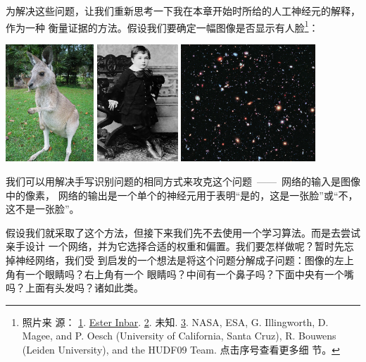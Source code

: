 为解决这些问题，让我们重新思考一下我在本章开始时所给的人工神经元的解释，作为一种
衡量证据的方法。假设我们要确定一幅图像是否显示有人脸\footnote{照片来
  源：
  \href{http://commons.wikimedia.org/wiki/File:Kangaroo_ST_03.JPG}{1}. \href{http://commons.wikimedia.org/wiki/User:ST}{Ester
    Inbar}. \href{http://commons.wikimedia.org/wiki/File:Albert_Einstein_at_the_age_of_three_(1882).jpg}{2}. 未知. \href{http://commons.wikimedia.org/wiki/File:The_Hubble_eXtreme_Deep_Field.jpg}{3}. NASA,
  ESA, G. Illingworth, D. Magee, and P. Oesch (University of California, Santa
  Cruz), R. Bouwens (Leiden University), and the HUDF09 Team. 点击序号查看更多细
  节。}：
\begin{center}
\includegraphics[height=125pt]{images/Kangaroo_ST_03}
\includegraphics[height=125pt]{images/Albert_Einstein_at_the_age_of_three_(1882)}
\includegraphics[height=125pt]{images/The_Hubble_eXtreme_Deep_Field}
\end{center}

我们可以用解决手写识别问题的相同方式来攻克这个问题~——~网络的输入是图像中的像素，
网络的输出是一个单个的神经元用于表明“是的，这是一张脸”或“不，这不是一张脸”。

假设我们就采取了这个方法，但接下来我们先不去使用一个学习算法。而是去尝试亲手设计
一个网络，并为它选择合适的权重和偏置。我们要怎样做呢？暂时先忘掉神经网络，我们受
到启发的一个想法是将这个问题分解成子问题：图像的左上角有一个眼睛吗？右上角有一个
眼睛吗？中间有一个鼻子吗？下面中央有一个嘴吗？上面有头发吗？诸如此类。

